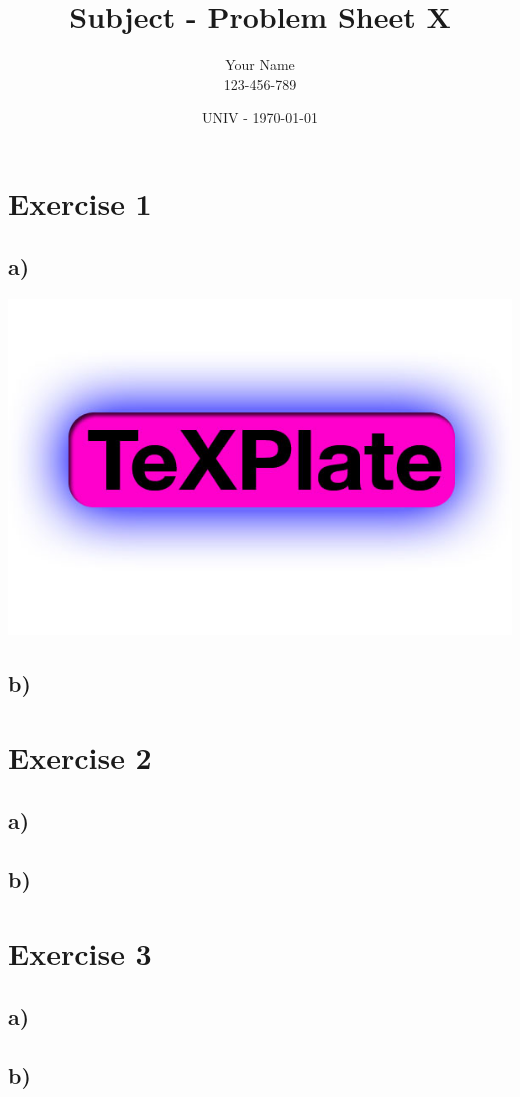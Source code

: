 \documentclass[10pt,a4paper]{article}
\author{Your Name\\\footnotesize 123-456-789}
\title{\textbf{\huge Subject - Problem Sheet X}}
\date{UNIV - \today}
\begin{document}
\maketitle

\section*{Exercise 1}

\subsection*{a)}

\begin{center}
\includegraphics[scale=0.75]{img/image.jpg}
\end{center}

\subsection*{b)}


\section*{Exercise 2}

\subsection*{a)}


\subsection*{b)}


\section*{Exercise 3}

\subsection*{a)}


\subsection*{b)}
\end{document}
